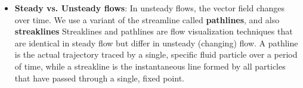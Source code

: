 \documentclass{report}
\begin{document}
\begin{itemize}
\begin{itemize}
\begin{enumerate}
                    \end{enumerate}
            \end{itemize}
        \item \textbf{Steady vs. Unsteady flows}: In unsteady flows, the vector field changes over time. We use a variant of the streamline called \textbf{pathlines}, and also \textbf{streaklines}
            \bigbreak \noindent 
            Streaklines and pathlines are flow visualization techniques that are identical in steady flow but differ in unsteady (changing) flow. A pathline is the actual trajectory traced by a single, specific fluid particle over a period of time, while a streakline is the instantaneous line formed by all particles that have passed through a single, fixed point.
    \end{itemize}
\end{document}

